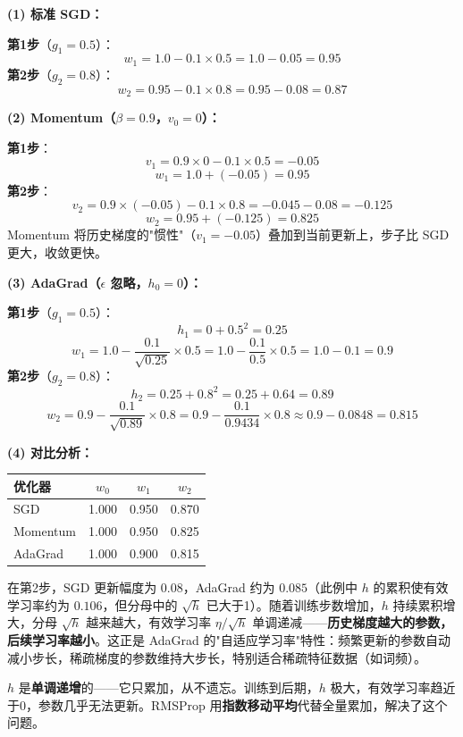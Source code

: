 \documentclass[a4paper,11pt]{ctexart}
\begin{document}
\begin{solutionbox}[参考答案与详细解析]
    \textbf{(1) 标准 SGD：}

    \textbf{第1步}（$g_1 = 0.5$）：
    \[
    w_1 = 1.0 - 0.1 \times 0.5 = 1.0 - 0.05 = 0.95
    \]
    \textbf{第2步}（$g_2 = 0.8$）：
    \[
    w_2 = 0.95 - 0.1 \times 0.8 = 0.95 - 0.08 = \boxed{0.87}
    \]

    \textbf{(2) Momentum（$\beta=0.9$，$v_0=0$）：}

    \textbf{第1步}：
    \[
    v_1 = 0.9 \times 0 - 0.1 \times 0.5 = -0.05
    \]
    \[
    w_1 = 1.0 + (-0.05) = 0.95
    \]
    \textbf{第2步}：
    \[
    v_2 = 0.9 \times (-0.05) - 0.1 \times 0.8 = -0.045 - 0.08 = -0.125
    \]
    \[
    w_2 = 0.95 + (-0.125) = \boxed{0.825}
    \]
    Momentum 将历史梯度的"惯性"（$v_1=-0.05$）叠加到当前更新上，步子比 SGD 更大，收敛更快。

    \textbf{(3) AdaGrad（$\epsilon$ 忽略，$h_0=0$）：}

    \textbf{第1步}（$g_1=0.5$）：
    \[
    h_1 = 0 + 0.5^2 = 0.25
    \]
    \[
    w_1 = 1.0 - \frac{0.1}{\sqrt{0.25}} \times 0.5 = 1.0 - \frac{0.1}{0.5} \times 0.5 = 1.0 - 0.1 = 0.9
    \]
    \textbf{第2步}（$g_2=0.8$）：
    \[
    h_2 = 0.25 + 0.8^2 = 0.25 + 0.64 = 0.89
    \]
    \[
    w_2 = 0.9 - \frac{0.1}{\sqrt{0.89}} \times 0.8 = 0.9 - \frac{0.1}{0.9434} \times 0.8 \approx 0.9 - 0.0848 = \boxed{0.815}
    \]

    \textbf{(4) 对比分析：}

    \begin{center}
    \begin{tabular}{lccc}
        \toprule
        优化器 & $w_0$ & $w_1$ & $w_2$ \\
        \midrule
        SGD & 1.000 & 0.950 & 0.870 \\
        Momentum & 1.000 & 0.950 & 0.825 \\
        AdaGrad & 1.000 & 0.900 & 0.815 \\
        \bottomrule
    \end{tabular}
    \end{center}

    在第2步，SGD 更新幅度为 $0.08$，AdaGrad 约为 $0.085$（此例中 $h$ 的累积使有效学习率约为 $0.106$，但分母中的 $\sqrt{h}$ 已大于1）。随着训练步数增加，$h$ 持续累积增大，分母 $\sqrt{h}$ 越来越大，有效学习率 $\eta/\sqrt{h}$ 单调递减——\textbf{历史梯度越大的参数，后续学习率越小}。这正是 AdaGrad 的"自适应学习率"特性：频繁更新的参数自动减小步长，稀疏梯度的参数维持大步长，特别适合稀疏特征数据（如词频）。

    \begin{keybox}
        $h$ 是\textbf{单调递增}的——它只累加，从不遗忘。训练到后期，$h$ 极大，有效学习率趋近于0，参数几乎无法更新。RMSProp 用\textbf{指数移动平均}代替全量累加，解决了这个问题。
    \end{keybox}
\end{solutionbox}
\end{document}
